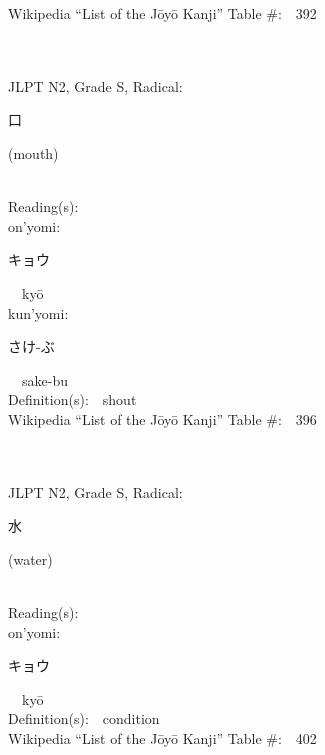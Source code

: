 \begin{multicols}{2}
Wikipedia ``List of the J\=oy\=o Kanji'' Table \#:\ \ 392 \\
\ \ \\
{\fontsize{34pt}{40pt}  }\ \ \\  %
{JLPT N2, Grade S, Radical:\ \ {\begin{CJK}{UTF8}{min} 口 \end{CJK}} (mouth) } \\
Reading(s):\ \ \\
{\hspace*{1em}}on'yomi:\ \ \\
{\hspace*{2em}}{\begin{CJK}{UTF8}{min} キョウ \end{CJK}}\ \ ky\=o\ \ \\
{\hspace*{1em}}kun'yomi:\ \ \\
{\hspace*{2em}}{\begin{CJK}{UTF8}{min} さけ-ぶ \end{CJK}}\ \ sake-bu\ \ \\
Definition(s):\ \ shout \\
Wikipedia ``List of the J\=oy\=o Kanji'' Table \#:\ \ 396 \\
\ \ \\
{\fontsize{34pt}{40pt}  }\ \ \\  %
{JLPT N2, Grade S, Radical:\ \ {\begin{CJK}{UTF8}{min} 水 \end{CJK}} (water) } \\
Reading(s):\ \ \\
{\hspace*{1em}}on'yomi:\ \ \\
{\hspace*{2em}}{\begin{CJK}{UTF8}{min} キョウ \end{CJK}}\ \ ky\=o\ \ \\
Definition(s):\ \ condition \\
Wikipedia ``List of the J\=oy\=o Kanji'' Table \#:\ \ 402 \\

\end{multicols}
